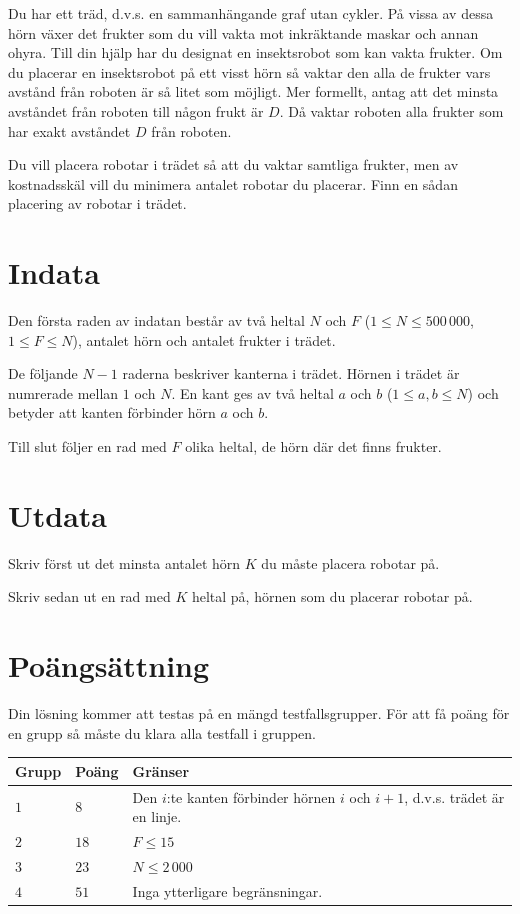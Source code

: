 Du har ett träd, d.v.s. en sammanhängande graf utan cykler.
På vissa av dessa hörn växer det frukter som du vill vakta mot inkräktande maskar och annan ohyra.
Till din hjälp har du designat en insektsrobot som kan vakta frukter.
Om du placerar en insektsrobot på ett visst hörn så vaktar den alla de frukter vars avstånd från roboten är så litet som möjligt.
Mer formellt, antag att det minsta avståndet från roboten till någon frukt är $D$.
Då vaktar roboten alla frukter som har exakt avståndet $D$ från roboten.

Du vill placera robotar i trädet så att du vaktar samtliga frukter, men av kostnadsskäl vill du minimera antalet robotar du placerar.
Finn en sådan placering av robotar i trädet.

\section*{Indata}
Den första raden av indatan består av två heltal $N$ och $F$ ($1 \le N \le 500\,000$, $1 \le F \le N$), antalet hörn och antalet frukter i trädet.

De följande $N - 1$ raderna beskriver kanterna i trädet.
Hörnen i trädet är numrerade mellan $1$ och $N$.
En kant ges av två heltal $a$ och $b$ ($1 \le a, b \le N$) och betyder att kanten förbinder hörn $a$ och $b$.

Till slut följer en rad med $F$ olika heltal, de hörn där det finns frukter.

\section*{Utdata}
Skriv först ut det minsta antalet hörn $K$ du måste placera robotar på.

Skriv sedan ut en rad med $K$ heltal på, hörnen som du placerar robotar på.

\section*{Poängsättning}
Din lösning kommer att testas på en mängd testfallsgrupper.
För att få poäng för en grupp så måste du klara alla testfall i gruppen.

\noindent
\begin{tabular}{| l | l | p{12cm} |}
  \hline
  \textbf{Grupp} & \textbf{Poäng} & \textbf{Gränser} \\ \hline
    $1$   & $8$      & Den $i$:te kanten förbinder hörnen $i$ och $i + 1$, d.v.s. trädet är en linje. \\ \hline
    $2$   & $18$     & $F \le 15$ \\ \hline
    $3$   & $23$     & $N \le 2\,000$ \\ \hline
    $4$   & $51$     & Inga ytterligare begränsningar. \\ \hline
\end{tabular}

